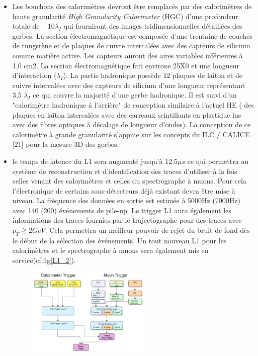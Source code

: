 \begin{itemize}[label=$\bullet$]
	\item Les bouchons des calorimètres devront être remplacés par des calorimètres de haute granularité \textit{High Granularity Calorimeter} (HGC) d'une profondeur totale de ~ 10$\lambda_{I}$ qui fourniront des images tridimensionnelles détaillées des gerbes. La section électromagnétique est composée d'une trentaine de couches de tungstène et de plaques de cuivre intercalées avec des capteurs de silicium comme matière active. Les capteurs auront des aires variables inférieures à ~ 1,0 cm2. La section électromagnétique fait environs 25X0 et une longueur d'interaction ($\lambda_{I}$). La partie hadronique possède 12 plaques de laiton et de cuivre intercalées avec des capteurs de silicium d'une longueur représentant 3,5 $\lambda_{I}$ ce qui couvre la majorité d'une gerbe hadronique. Il est suivi d'un "calorimètre hadronique à l'arrière" de conception similaire à l'actuel HE ( des plaques en laiton intercalées avec des carreaux scintillants en plastique lus avec des fibres optiques à décalage de longueur d'ondes). La conception de ce calorimètre à grande granularité s'appuie sur les concepts du ILC / CALICE [21] pour la mesure 3D des gerbes.
	\item le temps de latence du L1 sera augmenté jusqu'à 12.5$\mu s$ ce qui permettra au système de reconstruction et d'identification des traces d'utiliser à la fois celles venant des calorimètres et celles du spectrographe à muons. Pour cela l'électronique de certains sous-détecteurs déjà existant devra être mise à niveau. La fréquence des données en sortie est estimée à 5000Hz (7000Hz) avec 140 (200) événements de pile-up. Le trigger L1 aura également les informations des traces fournies par le trajectographe pour des traces avec $p_{T}\geqq2	GeV$. Cela permettra un meilleur pouvoir de rejet du bruit de fond dès le début de la sélection des événements. Un tout nouveau L1 pour les calorimètres et le spectrographe à muons sera également mis en service(cf.fig\ref{L1_2}).
	\begin{figure}[ht!]
		\centering
		\includegraphics[width=0.55\textwidth]{CMS/L1_2.png}

\end{figure}
\end{itemize}
